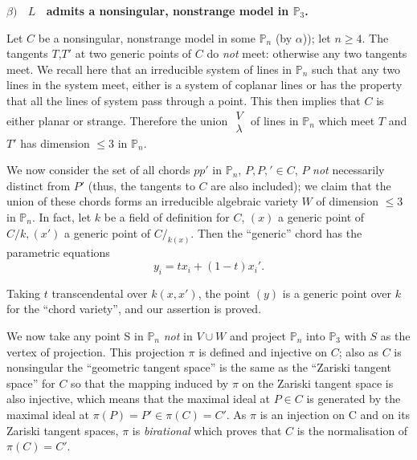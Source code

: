 \medskip
\noindent
{\bf {\boldmath $\beta)$~ $L$}~ admits a nonsingular, nonstrange model in $\mathbb{P}_3$.}
\medskip

Let $C$ be a nonsingular, nonstrange model in some ${\mathbb{P}_n}$
(by $\alpha$)); let $n \geq 4$. The tangents $T$,$T'$ at two generic
points of $C$ do \textit{not} meet: otherwise any two tangents
meet. We recall here that an irreducible system of lines in
${\mathbb{P}_n}$ such that any two lines in the system meet, either is
a system of coplanar lines or has the property that all the lines of
system pass through a point. This then implies that $C$ is either\pageoriginale
planar or strange. Therefore the union $\begin{matrix}V
  \\ \lambda \end{matrix}$ of lines in ${\mathbb{P}_n}$ which meet $T$
and $T'$ has dimension $\leq 3$ in ${\mathbb{P}_n}$. 

We now consider the set of all chords $pp'$ in ${\mathbb{P}_n}$,
$P, P,'\in C$, $P$ \textit{not} necessarily distinct from $P'$ (thus,
the tangents to $C$ are also included); we claim that the union of
these chords forms an irreducible algebraic variety $W$ of dimension
$\leq 3$ in ${\mathbb{P}_n}$. In fact, let $k$ be a field of
definition for $C$, $(x)$ a generic point of $C/k,(x')$ a generic
point of $C/_{k(x)}$. Then the ``generic'' chord has the parametric
equations 
$$
{y_i = tx_{i} + (1-t)x_{i}'}.
$$

Taking $t$ transcendental over $k(x,x')$, the point $(y)$ is a generic
point over $k$ for the ``chord variety'', and our assertion is proved. 

We now take any point S in ${\mathbb{P}_n}$ \textit{not} in $V \cup W$
and project ${\mathbb{P}_n}$ into ${\mathbb{P}_3} $ with $S$ as the
vertex of projection. This projection $\pi $ is defined and injective
on $C$; also as $C$ is nonsingular the ``geometric tangent space'' is
the same as the ``Zariski tangent space'' for $C$ so that the mapping
induced by $\pi$ on the Zariski tangent space is also injective, which
means that the maximal ideal at $P \in C$ is generated by the maximal
ideal at $\pi(P) = P'\in \pi(C) = C'$. As $\pi$ is an injection on C
and on its Zariski tangent spaces, $\pi$ is \textit{birational} which
proves that $C$ is the normalisation of $\pi(C) = C'$.

